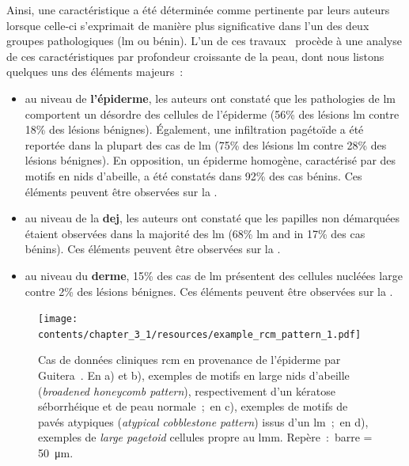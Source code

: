 Ainsi, une caractéristique a été déterminée comme pertinente par leurs auteurs lorsque celle-ci s'exprimait de manière plus significative dans l'un des deux groupes pathologiques (\gls{lm} ou bénin). L'un de ces travaux~\cite{Guitera2010} procède à une analyse de ces caractéristiques par profondeur croissante de la peau, dont nous listons quelques uns des éléments majeurs~:
\begin{itemize}
    \item au niveau de \textbf{l'épiderme}, les auteurs ont constaté que les pathologies de \gls{lm} comportent un désordre des cellules de l'épiderme (56\% des lésions \gls{lm} contre 18\% des lésions bénignes). Également, une infiltration pagétoïde a été reportée dans la plupart des cas de \gls{lm} (75\% des lésions \gls{lm} contre 28\% des lésions bénignes). En opposition, un épiderme homogène, caractérisé par des motifs en nids d'abeille, a été constatés dans 92\% des cas bénins. Ces éléments peuvent être observées sur la .
    \item au niveau de la \textbf{\gls{dej}}, les auteurs ont constaté que les papilles non démarquées étaient observées dans la majorité des \gls{lm} (68\% \gls{lm} and in 17\% des cas bénins). Ces éléments peuvent être observées sur la  .
    \item au niveau du \textbf{derme}, 15\% des cas de \gls{lm} présentent des cellules nucléées large contre 2\% des lésions bénignes. Ces éléments peuvent être observées sur la .
\end{itemize}\par

\begin{figure}[H]
    \begin{center}
        \texttt{[image: contents/chapter\_3\_1/resources/example\_rcm\_pattern\_1.pdf]}
        \caption{Cas de données cliniques \gls{rcm} en provenance de l'épiderme par Guitera~\cite{Guitera2010}. En a) et b), exemples de motifs en large nids d'abeille (\textit{broadened honeycomb pattern}), respectivement d'un kératose séborrhéique et de peau normale~;~en c), exemples de motifs de pavés atypiques (\textit{atypical cobblestone pattern}) issus d'un \gls{lm}~;~en d), exemples de \textit{large pagetoid} cellules propre au \gls{lmm}. Repère~:~barre = \SI{50}{\micro\metre}.}
        \label{fig:example_rcm_pattern_1}
    \end{center} 
\end{figure}\par


